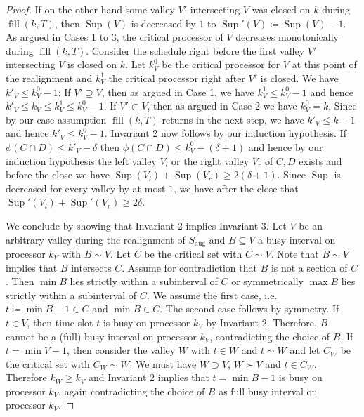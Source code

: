 \documentclass[a4paper]{article}
\DeclareMathOperator{\aug}{aug}
\DeclareMathOperator{\fillop}{fill}
\DeclareMathOperator{\res}{Sup}
\begin{document}
\begin{proof}
      If on the other hand some valley $V'$ intersecting $V$ was closed on $k$ during $\fillop(k, T)$, then $\res(V)$ is decreased by $1$ to $\res'(V) \coloneqq \res(V) - 1$.
      As argued in Cases 1 to 3, the critical processor of $V$ decreases monotonically during $\fillop(k, T)$.
      Consider the schedule right before the first valley $V'$ intersecting $V$ is closed on $k$.
      Let $k^0_V$ be the critical processor for $V$ at this point of the realignment and $k^1_V$ the critical processor right after $V'$ is closed.
      We have $k'_V \leq k^0_V - 1$:
      If $V' \supseteq V$, then as argued in Case 1, we have $k^1_V \leq k^0_V - 1$ and hence $k'_V \leq k_V \leq k^1_V \leq k^0_V -1$.
      If $V' \subset V$, then as argued in Case 2 we have $k^0_V = k$.
      Since by our case assumption $\fillop(k, T)$ returns in the next step, we have $k'_V \leq k - 1$ and hence $k'_V \leq k^0_V -1$.
      Invariant 2 now follows by our induction hypothesis.
      If $\phi(C \cap D) \leq k'_V - \delta$ then $\phi(C \cap D) \leq k^0_V - (\delta + 1)$ and hence by our induction hypothesis the left valley $V_l$ or the right valley $V_r$ of $C, D$ exists and before the close we have $\res(V_l) + \res(V_r) \geq 2 (\delta + 1)$.
      Since $\res$ is decreased for every valley by at most $1$, we have after the close that $\res'(V_l) + \res'(V_r) \geq 2 \delta$.

  We conclude by showing that Invariant 2 implies Invariant 3.
  Let $V$ be an arbitrary valley during the realignment of $S_{\aug}$ and $B \subseteq V$ a busy interval on processor $k_V$ with $B \sim V$.
  Let $C$ be the critical set with $C \sim V$.
  Note that $B \sim V$ implies that $B$ intersects $C$.
  Assume for contradiction that $B$ is not a section of $C$.
  Then $\min B$ lies strictly within a subinterval of $C$ or symmetrically $\max B$ lies strictly within a subinterval of $C$.
  We assume the first case, i.e.\ $t\coloneqq \min B - 1 \in C$ and $\min B \in C$.
  The second case follows by symmetry.
  If $t \in V$, then time slot $t$ is busy on processor $k_V$ by Invariant 2.
  Therefore, $B$ cannot be a (full) busy interval on processor $k_V$, contradicting the choice of $B$.
  If $t = \min V-1$, then consider the valley $W$ with $t \in W$ and $t \sim W$ and let $C_W$ be the critical set with $C_W \sim W$.
  We must have $W \supset V$, $W \succ V$ and $t \in C_W$.
  Therefore $k_W \geq k_V$ and Invariant 2 implies that $t = \min B - 1$ is busy on processor $k_V$, again contradicting the choice of $B$ as full busy interval on processor $k_V$.
\end{proof}
\end{document}
